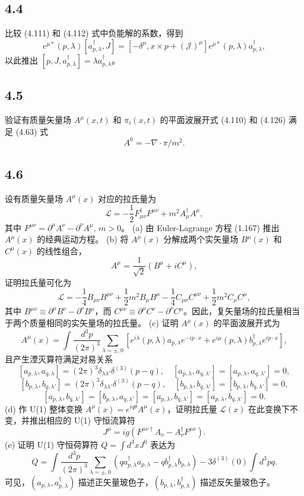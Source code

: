 \newpage
\subsection{4.4}
比较 (4.111) 和 (4.112) 式中负能解的系数，得到
$$e^{\mu*}(p, \lambda)[a_{p,\lambda}^\dagger, J] = [-\delta^\mu, x \times p + (\mathcal{J})^\mu] e^{\mu*}(p, \lambda) a_{p,\lambda}^\dagger,$$
以此推出 $[p, J, a_{p,\lambda}^\dagger] = \lambda a_{p,\lambda}^\dagger$。

\newpage
\subsection{4.5}
验证有质量矢量场 $A^\mu(x,t)$ 和 $\pi_i(x,t)$ 的平面波展开式 (4.110) 和 (4.126) 满足 (4.63) 式
$$A^0 = -\nabla \cdot \pi / m^2.$$

\newpage
\subsection{4.6}
设有质量矢量场 $A^\mu(x)$ 对应的拉氏量为
$$\mathcal{L} = -\frac{1}{2} F_{\mu\nu}^\dagger F^{\mu\nu} + m^2 A_\mu^\dagger A^\mu,$$
其中 $F^{\mu\nu} = \partial^\mu A^\nu - \partial^\nu A^\mu, \, m > 0$。
(a) 由 Euler-Lagrange 方程 (1.167) 推出 $A^\mu(x)$ 的经典运动方程。
(b) 将 $A^\mu(x)$ 分解成两个实矢量场 $B^\mu(x)$ 和 $C^\mu(x)$ 的线性组合，
$$A^\mu = \frac{1}{\sqrt{2}} (B^\mu + iC^\mu),$$
证明拉氏量可化为
$$\mathcal{L} = -\frac{1}{4} B_{\mu\nu} B^{\mu\nu} + \frac{1}{2} m^2 B_\mu B^\mu - \frac{1}{4} C_{\mu\nu} C^{\mu\nu} + \frac{1}{2} m^2 C_\mu C^\mu,$$
其中 $B^{\mu\nu} \equiv \partial^\mu B^\nu - \partial^\nu B^\mu$，而 $C^{\mu\nu} \equiv \partial^\mu C^\nu - \partial^\nu C^\mu$。因此，复矢量场的拉氏量相当于两个质量相同的实矢量场的拉氏量。
(c) 证明 $A^\mu(x)$ 的平面波展开式为
$$A^\mu(x) = \int \frac{d^3 p}{(2\pi)^3} \sum_{\lambda=\pm,0} \left[ e^{i\lambda}(p,\lambda)a_{p,\lambda}e^{-ip\cdot x} + e^{i\mu}(p,\lambda)b_{p,\lambda}^{\dagger}e^{ip\cdot x} \right],$$
且产生湮灭算符满足对易关系
$$[a_{p,\lambda}, a_{q,\lambda}] = (2\pi)^3 \delta_{\lambda \lambda'} \delta^{(3)}(p-q), \quad [a_{p,\lambda}, a_{q,\lambda'}] = [a_{p,\lambda}, a_{q,\lambda'}] = 0,$$
$$[b_{p,\lambda}, b_{q,\lambda'}] = (2\pi)^3 \delta_{\lambda \lambda'} \delta^{(3)}(p-q), \quad [b_{p,\lambda}, b_{q,\lambda'}] = [b_{p,\lambda}, b_{q,\lambda'}] = 0,$$
$$[a_{p,\lambda}, b_{q,\lambda'}] = [b_{p,\lambda}, a_{q,\lambda'}] = [a_{p,\lambda}, b_{q,\lambda'}] = [a_{p,\lambda}, b_{q,\lambda'}] = 0.$$
(d) 作 U(1) 整体变换 $A^\mu(x) = e^{iq\theta} A^\mu(x)$，证明拉氏量 $\mathcal{L}(x)$ 在此变换下不变，并推出相应的 U(1) 守恒流算符
$$J^\mu = ig(F^{\mu\nu\dagger}A_\nu - A_\nu^\dagger F^{\mu\nu}).$$
(e) 证明 U(1) 守恒荷算符 $Q = \int d^3 x J^0$ 表达为
$$Q = \int \frac{d^3 p}{(2\pi)^3} \sum_{\lambda=\pm,0} (q a_{p,\lambda}^\dagger a_{p,\lambda} - q b_{p,\lambda}^\dagger b_{p,\lambda}) - 3\delta^{(3)}(0) \int d^3 p q.$$
可见，$(a_{p,\lambda}, a_{p,\lambda}^\dagger)$ 描述正矢量玻色子，$(b_{p,\lambda}, b_{p,\lambda}^\dagger)$ 描述反矢量玻色子。

